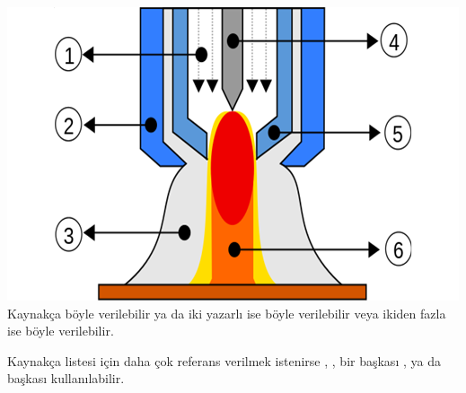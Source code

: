 {\includegraphics[width=\textwidth]{gorseller/ptaTorc}}
\lipsum[1-2]
Kaynakça böyle verilebilir \parencite{celik_microstructure_2013} ya da iki yazarlı ise böyle verilebilir \parencite{gatto_plasma_2004} veya ikiden fazla ise böyle verilebilir.
\parencite{celik_effects_2011}

Kaynakça listesi için daha çok referans verilmek istenirse \parencite{yazdi_microstructure_2015, keehan_influence_2006, guo_microstructure_2014}, \parencite{kim_variation_2013}, bir başkası \parencite{xibao_metallurgical_2005},  ya da başkası \parencite{jin_effect_1997} kullanılabilir.